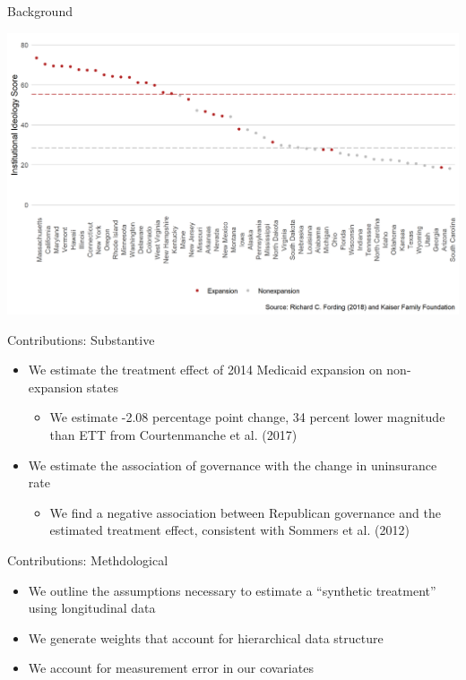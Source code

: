 \documentclass[hyperref={pdfpagelabels=false}]{beamer}
\begin{document}
\begin{frame}{Background}
    \begin{center}
	\includegraphics[scale=0.5]{01_Plots/political-expansion-plot.png}
    \end{center}
\end{frame}

\begin{frame}{Contributions: Substantive}
\begin{itemize}
    \item We estimate the treatment effect of 2014 Medicaid expansion on non-expansion states \bigskip
    
    \begin{itemize}
        \item We estimate -2.08 percentage point change, 34 percent lower magnitude than ETT from Courtenmanche et al. (2017) \bigskip 
    \end{itemize}

    \item We estimate the association of governance with the change in uninsurance rate \bigskip
    
    \begin{itemize}
        \item We find a negative association between Republican governance and the estimated treatment effect, consistent with Sommers et al. (2012) \bigskip 
    \end{itemize}
    \end{itemize}
\end{frame}

\begin{frame}{Contributions: Methdological}
\begin{itemize}
    \item We outline the assumptions necessary to estimate a ``synthetic treatment'' using longitudinal data \bigskip
    
    \item We generate weights that account for hierarchical data structure \bigskip
    
    \item We account for measurement error in our covariates \bigskip
    \end{itemize}
\end{frame}
\end{document}
